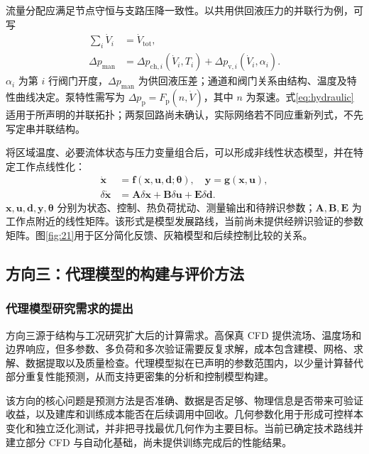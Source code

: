 \documentclass[UTF8]{midterm}
\begin{document}
流量分配应满足节点守恒与支路压降一致性。以共用供回液压力的并联行为例，可写
\begin{equation}\begin{aligned}
\sum_i\dot V_i&=\dot V_{\mathrm{tot}},\\
\Delta p_{\mathrm{man}}&=\Delta p_{\mathrm{ch},i}(\dot V_i,T_i)
+\Delta p_{\mathrm{v},i}(\dot V_i,\alpha_i).
\end{aligned}\label{eq:hydraulic}
\end{equation}
$\alpha_i$ 为第 $i$ 行阀门开度，$\Delta p_{\mathrm{man}}$ 为供回液压差；通道和阀门关系由结构、温度及特性曲线决定。泵特性需写为 $\Delta p_{\mathrm p}=F_{\mathrm p}(n,\dot V)$，其中 $n$ 为泵速。式\eqref{eq:hydraulic}适用于所声明的并联拓扑；两泵回路尚未确认，实际网络若不同应重新列式，不先写定串并联结构。

将区域温度、必要流体状态与压力变量组合后，可以形成非线性状态模型，并在特定工作点线性化：
\begin{equation}\begin{aligned}
\dot{\bm x}&=\bm f(\bm x,\bm u,\bm d;\bm\theta),\quad\bm y=\bm g(\bm x,\bm u),\\
\delta\dot{\bm x}&=\bm A\delta\bm x+\bm B\delta\bm u+\bm E\delta\bm d.
\end{aligned}\label{eq:state}
\end{equation}
$\bm x,\bm u,\bm d,\bm y,\bm\theta$ 分别为状态、控制、热负荷扰动、测量输出和待辨识参数；$\bm A,\bm B,\bm E$ 为工作点附近的线性矩阵。该形式是模型发展路线，当前尚未提供经辨识验证的参数矩阵。图\ref{fig:21}用于区分简化反馈、灰箱模型和后续控制比较的关系。

\subsection{方向三：代理模型的构建与评价方法}
\subsubsection{代理模型研究需求的提出}
方向三源于结构与工况研究扩大后的计算需求。高保真 CFD 提供流场、温度场和边界响应，但多参数、多负荷和多次验证需要反复求解，成本包含建模、网格、求解、数据提取以及质量检查。代理模型拟在已声明的参数范围内，以少量计算替代部分重复性能预测，从而支持更密集的分析和控制模型构建。

该方向的核心问题是预测方法是否准确、数据是否足够、物理信息是否带来可验证收益，以及建库和训练成本能否在后续调用中回收。几何参数化用于形成可控样本变化和独立泛化测试，并非把寻找最优几何作为主要目标。当前已确定技术路线并建立部分 CFD 与自动化基础，尚未提供训练完成后的性能结果。
\end{document}
